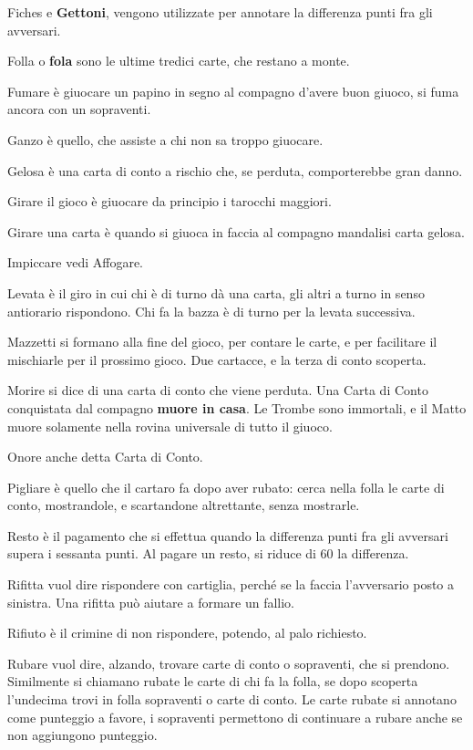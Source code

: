 \documentclass[11pt,a6paper]{article}
\begin{document}
\begin{list}
\item[Fiches] e \textbf{Gettoni}, vengono utilizzate per annotare la differenza punti fra gli avversari.
\item[Folla] o \textbf{fola} sono le ultime tredici carte, che restano a monte.
\item[Fumare] è giuocare un papino in segno al compagno d'avere buon giuoco, si fuma ancora con un sopraventi.
\item[Ganzo] è quello, che assiste a chi non sa troppo giuocare.
\item[Gelosa] è una carta di conto a rischio che, se perduta, comporterebbe gran danno.
\item[Girare il gioco] è giuocare da principio i tarocchi maggiori.
\item[Girare una carta] è quando si giuoca in faccia al compagno mandalisi carta gelosa.
\item[Impiccare] vedi Affogare.
\item[Levata] è il giro in cui chi è di turno dà una carta, gli altri a turno in senso antiorario rispondono. Chi fa la bazza è di turno per la levata successiva.
\item[Mazzetti] si formano alla fine del gioco, per contare le carte, e per facilitare il mischiarle per il prossimo gioco. Due cartacce, e la terza di conto scoperta.
\item[Morire] si dice di una carta di conto che viene perduta. Una Carta di Conto conquistata dal compagno \textbf{muore in casa}. Le Trombe sono immortali, e il Matto muore solamente nella rovina universale di tutto il giuoco.
\item[Onore] anche detta Carta di Conto.
\item[Pigliare] è quello che il cartaro fa dopo aver rubato: cerca nella folla le carte di conto, mostrandole, e scartandone altrettante, senza mostrarle.
\item[Resto] è il pagamento che si effettua quando la differenza punti fra gli avversari supera i sessanta punti. Al pagare un resto, si riduce di 60 la differenza.
\item[Rifitta] vuol dire rispondere con cartiglia, perché se la faccia l'avversario posto a sinistra. Una rifitta può aiutare a formare un fallio.
\item[Rifiuto] è il crimine di non rispondere, potendo, al palo richiesto.
\item[Rubare] vuol dire, alzando, trovare carte di conto o sopraventi, che si prendono. Similmente si chiamano rubate le carte di chi fa la folla, se dopo scoperta l'undecima trovi in folla sopraventi o carte di conto. Le carte rubate si annotano come punteggio a favore, i sopraventi permettono di continuare a rubare anche se non aggiungono punteggio.

\end{list}
\end{document}
